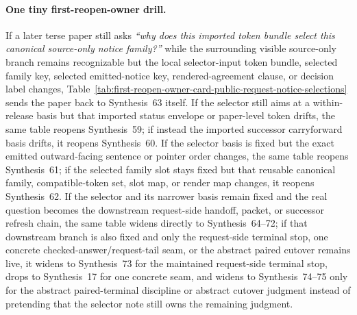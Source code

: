 \documentclass[11pt]{article}
\begin{document}
\paragraph{One tiny first-reopen-owner drill.}
If a later terse paper still asks \emph{``why does this imported token bundle select this canonical source-only notice family?''} while the surrounding visible source-only branch remains recognizable but the local selector-input token bundle, selected family key, selected emitted-notice key, rendered-agreement clause, or decision label changes, Table~\ref{tab:first-reopen-owner-card-public-request-notice-selections} sends the paper back to Synthesis~63 itself. If the selector still aims at a within-release basis but that imported status envelope or paper-level token drifts, the same table reopens Synthesis~59; if instead the imported successor carryforward basis drifts, it reopens Synthesis~60. If the selector basis is fixed but the exact emitted outward-facing sentence or pointer order changes, the same table reopens Synthesis~61; if the selected family slot stays fixed but that reusable canonical family, compatible-token set, slot map, or render map changes, it reopens Synthesis~62. If the selector and its narrower basis remain fixed and the real question becomes the downstream request-side handoff, packet, or successor refresh chain, the same table widens directly to Synthesis~64--72; if that downstream branch is also fixed and only the request-side terminal stop, one concrete checked-answer/request-tail seam, or the abstract paired cutover remains live, it widens to Synthesis~73 for the maintained request-side terminal stop, drops to Synthesis~17 for one concrete seam, and widens to Synthesis~74--75 only for the abstract paired-terminal discipline or abstract cutover judgment instead of pretending that the selector note still owns the remaining judgment.\cite{series:publicrequeststatusenvelopes,series:publicrequestcarryforward,series:publicrequestnotices,series:publicrequestnoticenormalforms,series:publicrequestresponsemenus,series:publicrequestresponsepackets,series:publicrequestresponsepacketcarryforward,series:publicrequestresponsepacketdeltaledgers,series:publicrequestresponsepacketrefreshnotices,series:publicrequestresponsepacketrefreshnormalforms,series:publicrequestresponsepacketrefreshselections,series:publicrequestresponsepacketrefreshresponsemenus,series:publicrequestresponsepacketrefreshresponsepackets,series:publicrequestresponsepacketrefreshresponsepacketclosureverdicts,series:pairedterminalcitationdiscipline,series:pairedterminalcutoverrule}
\end{document}
